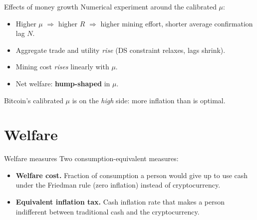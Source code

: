 \documentclass[aspectratio=169,xcolor=dvipsnames]{beamer}
\begin{document}
\begin{frame}{Effects of money growth}
    Numerical experiment around the calibrated $\mu$:
    \vspace{2mm}
    \begin{itemize}
        \item Higher $\mu$ $\Rightarrow$ higher $R$ $\Rightarrow$ higher mining effort,
              shorter average confirmation lag $N$.
        \item Aggregate trade and utility \emph{rise} (DS constraint relaxes, lags shrink).
        \item Mining cost \emph{rises} linearly with $\mu$.
        \item Net welfare: \textbf{hump-shaped} in $\mu$.
    \end{itemize}
    \vspace{3mm}
    Bitcoin's calibrated $\mu$ is on the \emph{high} side: more inflation than is optimal.
\end{frame}

\section{Welfare}

\begin{frame}{Welfare measures}
    Two consumption-equivalent measures:
    \vspace{2mm}
    \begin{itemize}
        \item \textbf{Welfare cost.} Fraction of consumption a person would give up to use
              cash under the Friedman rule (zero inflation) instead of cryptocurrency.
        \item \textbf{Equivalent inflation tax.} Cash inflation rate that makes a person
              indifferent between traditional cash and the cryptocurrency.
    \end{itemize}
\end{frame}
\end{document}
